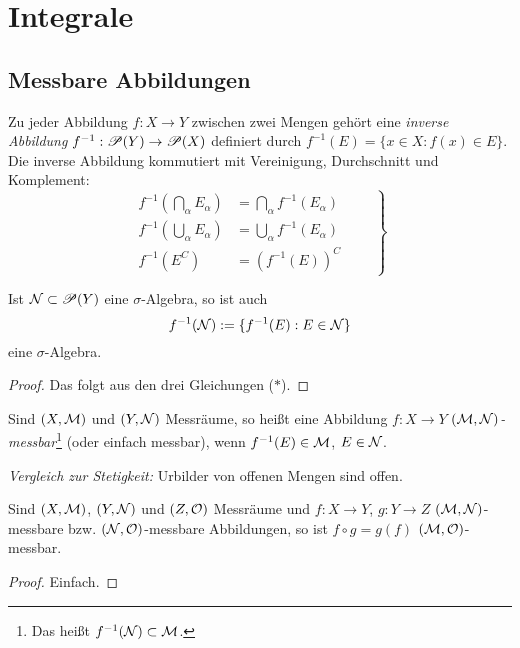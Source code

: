 \chapter{Integrale}
\section{Messbare Abbildungen}
Zu jeder Abbildung $f:X \to Y$ zwischen zwei Mengen gehört eine \emph{inverse Abbildung} $f^{-1}:\mathscr{P}(Y) \to \mathscr{P}(X)$ definiert durch $f^{-1}(E) = \{ x \in X : f(x) \in E \}.$ Die inverse Abbildung kommutiert mit Vereinigung, Durchschnitt und Komplement:
\begin{equation}
  \left.
 \begin{aligned}
 f^{-1} \left( \bigcap_\alpha E_\alpha \right) &= \bigcap_\alpha f^{-1}(E_\alpha) \\
 f^{-1} \left( \bigcup_\alpha E_\alpha \right) &= \bigcup_\alpha f^{-1}(E_\alpha) \\
 f^{-1} ( E^C ) &= (f^{-1}(E) )^C
\end{aligned}
\qquad
\right\}
 \tag{$\ast$}
\end{equation}

\begin{lem}
 Ist $\mathcal{N} \subset \mathscr{P}(Y)$ eine $\sigma$-Algebra, so ist auch
 \[ f^{-1}(\mathcal{N}) := \{ f^{-1}(E) : E \in \mathcal{N} \} \]
 eine $\sigma$-Algebra.
\end{lem}

\begin{proof}
 Das folgt aus den drei Gleichungen ($\ast$).
\end{proof}

\begin{defn}
 Sind $(X,\mathcal{M})$ und $(Y,\mathcal{N})$ Messräume, so heißt eine Abbildung $f: X \to Y$ \emph{$(\mathcal{M},\mathcal{N})$-messbar}\footnote{Das heißt $f^{-1}(\mathcal{N}) \subset \mathcal{M}$.} (oder einfach messbar), wenn $f^{-1}(E) \in \mathcal{M}$, $E \in \mathcal{N}$.
 
 \emph{Vergleich zur Stetigkeit:} Urbilder von offenen Mengen sind offen.
\end{defn}

\begin{lem}
 Sind $(X,\mathcal{M})$, $(Y,\mathcal{N})$ und $(Z,\mathcal{O})$ Messräume und $f:X \to Y$, $g: Y \to Z$ $(\mathcal{M},\mathcal{N})$-messbare bzw. $(\mathcal{N},\mathcal{O})$-messbare Abbildungen, so ist $f \circ g = g(f)$ $(\mathcal{M},\mathcal{O})$-messbar.
\end{lem}

\begin{proof}
 Einfach.
\end{proof}

